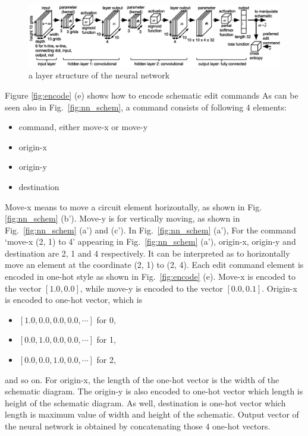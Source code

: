 \documentclass[twocolumn]{article}
\begin{document}
\begin{figure}[!tp]
 \begin{center}
  \begin{minipage}{\hsize}
   \includegraphics[width=\hsize]{fig/layers_06.eps}
   \caption{a layer structure of the neural network}
   \label{fig:layers}
  \end{minipage}
 \end{center}
\end{figure}

Figure \ref{fig:encode} (e) shows how to encode schematic edit commands
As can be seen also in Fig.\ \ref{fig:nn_schem},
a command consists of following 4 elements:
\begin{itemize}
\item command, either move-x or move-y
\item origin-x
\item origin-y
\item destination
\end{itemize}
Move-x means to move a circuit element horizontally,
as shown in Fig. \ref{fig:nn_schem} (b').
Move-y is for vertically moving, as shown in
Fig.\ \ref{fig:nn_schem} (a') and (c').
In Fig.\ \ref{fig:nn_schem} (a'), 
For the command `move-x (2, 1) to 4' appearing
in Fig.\ \ref{fig:nn_schem} (a'),
origin-x, origin-y and destination are 2, 1 and 4 respectively.
It can be interpreted as to horizontally move an element
at the coordinate (2, 1) to (2, 4).
Each edit command element is encoded in one-hot style
as shown in Fig.\ \ref{fig:encode} (e).
Move-x is encoded to the vector $[1.0, 0.0]$, 
while move-y is encoded to the vector $[0.0, 0.1]$. 
Origin-x is encoded to one-hot vector, which is
\begin{itemize}
\item $[1.0, 0.0, 0.0, 0.0, \cdots]$ for 0,
\item $[0.0, 1.0, 0.0, 0.0, \cdots]$ for 1, 
\item $[0.0, 0.0, 1.0, 0.0, \cdots]$ for 2,
\end{itemize}
and so on.
For origin-x, the length of the one-hot vector is the width of
the schematic diagram.
The origin-y is also encoded to one-hot vector which length is
height of the schematic diagram.
As well, destination is one-hot vector which length is
maximum value of width and height of the schematic.
Output vector of the neural network is obtained
by concatenating those 4 one-hot vectors.
\end{document}
